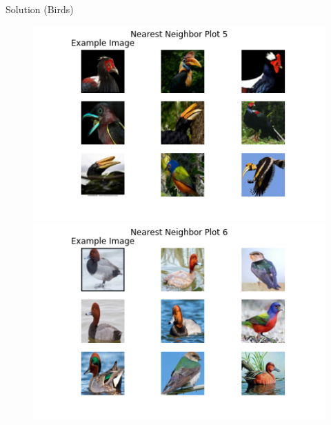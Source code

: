 \documentclass{beamer}
\begin{document}
\begin{frame}[t]{Solution (Birds)}
\begin{figure}
			\includegraphics[scale=0.2]{birds4.png}
			\includegraphics[scale=0.2]{birds5.png}
		\end{figure}
		\end{frame}
	
\end{document}
